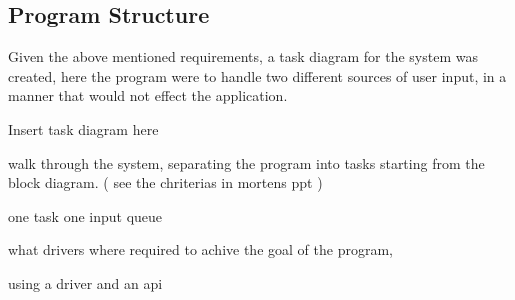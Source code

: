 \subsection{Program Structure}
\label{sec:ProgramStructure}

Given the above mentioned requirements, a task diagram for the system was created, here the program were to handle two different sources of user input, in a manner that would not effect the application. 

Insert task diagram here 


walk through the system, separating the program into tasks starting from the block diagram. ( see the chriterias in mortens ppt )

one task one input queue

what drivers where required to achive the goal of the program,



using a driver and an api